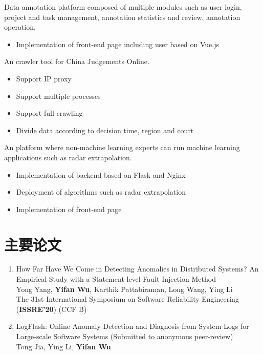 \documentclass{resume}
\begin{document}
Data annotation platform composed of multiple modules such as user login, project and task management, annotation statistics and review, annotation operation.
\begin{itemize}
  \item Implementation of front-end page including user based on Vue.js
\end{itemize}

An crawler tool for China Judgements Online.
\begin{itemize}
  \item Support IP proxy
  \item Support multiple processes
  \item Support full crawling
  \item Divide data according to decision time, region and court
\end{itemize}

An platform where non-machine learning experts can run machine learning applications such as radar extrapolation.
\begin{itemize}
  \item Implementation of backend based on Flask and Nginx
  \item Deployment of algorithms such as radar extrapolation
  \item Implementation of front-end page
\end{itemize}

\section{主要论文}
\begin{enumerate}[parsep=0.5ex]
  \item How Far Have We Come in Detecting Anomalies in Distributed Systems? An Empirical Study with a Statement-level Fault Injection Method\\
  Yong Yang, \textbf{Yifan Wu}, Karthik Pattabiraman, Long Wang, Ying Li\\
  The 31st International Symposium on Software Reliability Engineering (\textbf{ISSRE'20}) (CCF B)
\item LogFlash: Online Anomaly Detection and Diagnosis from System Logs for Large-scale Software Systems (Submitted to anonymous peer-review)\\
  Tong Jia, Ying Li, \textbf{Yifan Wu}\\
\end{enumerate}
\end{document}
